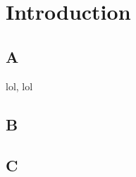 \chapter{Introduction}\label{ch:introduction}

\section{A}\label{sec:A}
\ac{lol}, \ac{lol}
\lipsum[1-5]

\section{B}\label{sec:B}
\lipsum[1-5]

\section{C}\label{sec:C}
\lipsum[1-5]